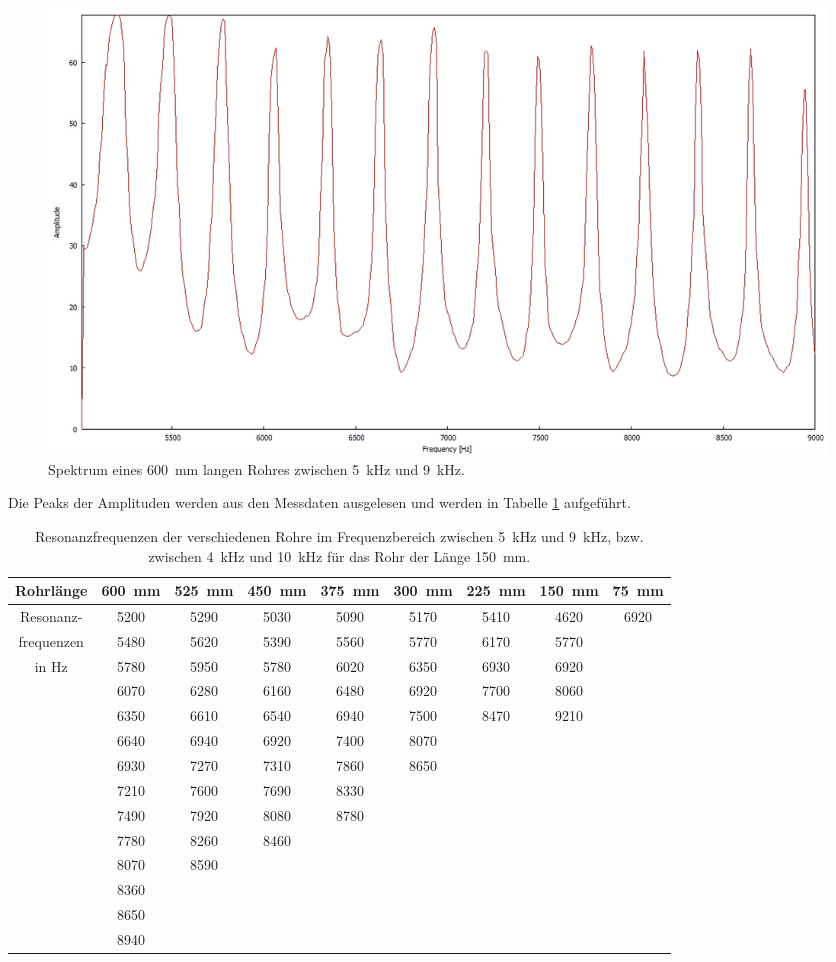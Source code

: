 \begin{figure}
\centering
\includegraphics[width=1\textwidth]{content/messungen/Chapter4/4_1_600mm.jpg}
\caption{Spektrum eines 600~mm langen Rohres zwischen 5~kHz und 9~kHz.}
\label{fig:4_1_600}
\end{figure}
Die Peaks der Amplituden werden aus den Messdaten ausgelesen und werden in Tabelle \ref{tab:4:1} aufgeführt.
\begin{table}
\centering
\caption{Resonanzfrequenzen der verschiedenen Rohre im Frequenzbereich zwischen 5~kHz und 9~kHz, bzw. zwischen 4~kHz und 10~kHz für das Rohr der Länge 150~mm.}
\label{tab:4:1}
\begin{tabular}{c c c c c c c c c}
\hline
Rohrlänge  &600~mm&525~mm&450~mm&375~mm&300~mm& 225~mm& 150~mm & 75~mm \\ \hline
Resonanz- &5200& 5290& 5030 &5090 &5170 &5410 &4620 &6920\\
frequenzen&5480& 5620& 5390& 5560& 5770& 6170& 5770&\\
in Hz&5780& 5950& 5780& 6020& 6350& 6930& 6920&\\
&6070& 6280& 6160& 6480& 6920& 7700& 8060&\\
&6350& 6610& 6540& 6940& 7500& 8470& 9210&\\
&6640& 6940& 6920& 7400& 8070&& &\\
&6930& 7270& 7310& 7860& 8650&&&\\
&7210& 7600& 7690& 8330& &&&\\
&7490& 7920& 8080& 8780&&&&\\
&7780& 8260& 8460&&&&&\\
&8070& 8590&&&&&&\\
&8360& &&&&&&\\
&8650&&&&&&&\\
&8940&&&&&&&\\
\hline
\end{tabular}
\end{table}
